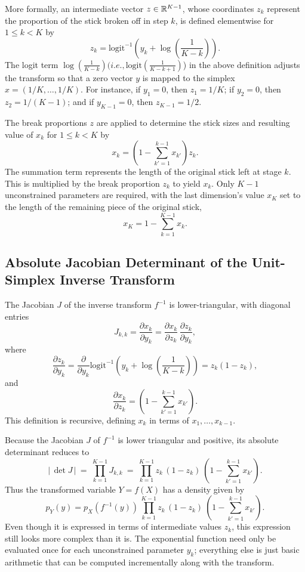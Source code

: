 More formally, an intermediate vector $z \in \mathbb{R}^{K-1}$, whose
coordinates $z_k$ represent the proportion of the stick broken off in
step $k$, is defined elementwise for $1 \leq k < K$ by
%
\[
z_k = \mbox{logit}^{-1} \left( y_k 
                             + \log \left( \frac{1}{K - k}
                                            \right)
                       \right).
\]
%
The logit term
$\log\left(\frac{1}{K-k}\right) (i.e., \mbox{logit}\left(\frac{1}{K-k+1}\right)$) in
the above definition adjusts the transform so that a
zero vector $y$ is mapped to the simplex $x = (1/K,\ldots,1/K)$.  For instance, if
$y_1 = 0$, then $z_1 = 1/K$; if $y_2 = 0$, then $z_2 = 1/(K-1)$; and
if $y_{K-1} = 0$, then $z_{K-1} = 1/2$.  

The break proportions $z$ are applied to determine the stick sizes and
resulting value of $x_k$ for $1 \leq k < K$ by
%
\[
x_k = 
\left( 1 - \sum_{k'=1}^{k-1} x_{k'} \right) z_k.
\]
%
The summation term represents the length of the original stick left at
stage $k$.  This is multiplied by the break proportion $z_k$ to yield
$x_k$.  Only $K-1$ unconstrained parameters are required, with
the last dimension's value $x_K$ set to the length of the remaining
piece of the original stick,
\[
x_K = 1 - \sum_{k=1}^{K-1} x_k.
\]

\subsection{Absolute Jacobian Determinant of the Unit-Simplex
  Inverse Transform}

The Jacobian $J$ of the inverse transform $f^{-1}$ is
lower-triangular, with diagonal entries
\[
J_{k,k}
=
\frac{\partial x_k}{\partial y_k}
=
\frac{\partial x_k}{\partial z_k} \,
\frac{\partial z_k}{\partial y_k},
\]
%
where
\[
\frac{\partial z_k}{\partial y_k} 
= \frac{\partial}{\partial y_k} 
   \mbox{logit}^{-1} \left(
                       y_k + \log \left( \frac{1}{K-k}
                                          \right)
                    \right)
= z_k (1 - z_k),
\]
%
and
%
\[
\frac{\partial x_k}{\partial z_k}
=
\left( 
  1 - \sum_{k' = 1}^{k-1} x_{k'}
   \right)
.
\]
%
This definition is recursive, defining $x_k$ in terms of
$x_{1},\ldots,x_{k-1}$.

Because the Jacobian $J$ of $f^{-1}$ is lower triangular and positive, its
absolute determinant reduces to
%
\[
\left| \, \det J \, \right|
\ = \
\prod_{k=1}^{K-1} J_{k,k}
\ = \
\prod_{k=1}^{K-1} 
z_k
\, 
(1 - z_k)
\
\left(
1 - \sum_{k'=1}^{k-1} x_{k'}
\right)
.
\]
%
Thus the transformed variable $Y = f(X)$ has a density given by
%
\[
p_Y(y) 
= p_X(f^{-1}(y))
\,
\prod_{k=1}^{K-1} 
z_k
\, 
(1 - z_k)
\
\left(
1 - \sum_{k'=1}^{k-1} x_{k'}
\right)
.
\]
%
Even though it is expressed in terms of intermediate values $z_k$,
this expression still looks more complex than it is. The exponential
function need only be evaluated once for each unconstrained parameter
$y_k$; everything else is just basic arithmetic that can be computed
incrementally along with the transform.

